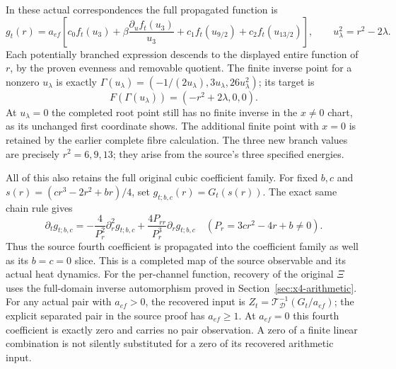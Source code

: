 In these actual correspondences the full propagated function is
\[
g_t(r)=a_{ef}\left[c_0f_t(u_3)+
 \beta\frac{\partial_uf_t(u_3)}{u_3}
 +c_1f_t(u_{9/2})+c_2f_t(u_{13/2})\right],\qquad
u_\lambda^2=r^2-2\lambda.
\]
Each potentially branched expression descends to the displayed entire
function of $r$, by the proven evenness and removable quotient. The
finite inverse point for a nonzero $u_\lambda$ is exactly
$\Gamma(u_\lambda)=(-1/(2u_\lambda),3u_\lambda,26u_\lambda^2)$;
its target is
\[
F(\Gamma(u_\lambda))=(-r^2+2\lambda,0,0).
\]
At $u_\lambda=0$ the completed root point still has no finite inverse
in the $x\ne0$ chart, as its unchanged first coordinate shows. The
additional finite point with $x=0$ is retained by the earlier complete
fibre calculation. The three new branch values are precisely
$r^2=6,9,13$; they arise from the source's three specified energies.

All of this also retains the full original cubic coefficient family.
For fixed $b,c$ and $s(r)=(cr^3-2r^2+br)/4$, set
$g_{t;b,c}(r)=G_t(s(r))$. The exact same chain rule gives
\[
\partial_tg_{t;b,c}=
 -\frac4{P_r^2}\partial_r^2g_{t;b,c}
 +\frac{4P_{rr}}{P_r^3}\partial_rg_{t;b,c}
 \quad(P_r=3cr^2-4r+b\ne0).
\]
Thus the source fourth coefficient is propagated into the coefficient
family as well as its $b=c=0$ slice. This is a completed map of the
source observable and its actual heat dynamics. For the per-channel
function, recovery of the original $\Xi$ uses the full-domain inverse
automorphism proved in Section~\ref{sec:x4-arithmetic}. For any actual
pair with $a_{ef}>0$, the recovered input is
$Z_t=\mathcal T_{\mathcal D}^{-1}(G_t/a_{ef})$; the explicit separated
pair in the source proof has $a_{ef}\ge1$. At $a_{ef}=0$ this fourth
coefficient is exactly zero and carries no pair observation. A zero of a finite linear
combination is not silently substituted for a zero of its recovered
arithmetic input.
